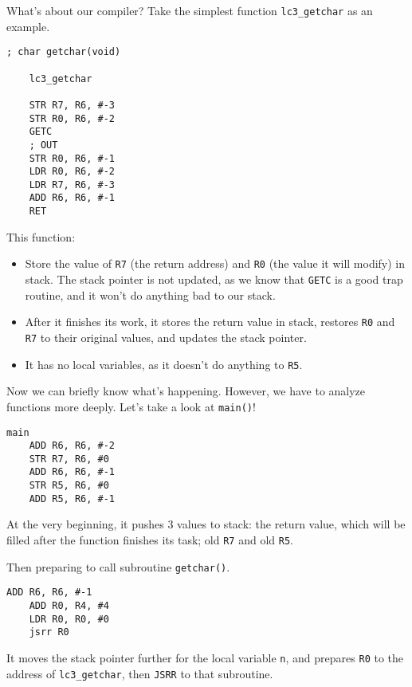 \documentclass{article}
\begin{document}
	What's about our compiler? Take the simplest function \texttt{lc3\_getchar} as an example.
	
	\begin{lstlisting}[caption={LC-3 implementation of \texttt{getchar()}}]
	; char getchar(void)
	
	lc3_getchar
	
	STR R7, R6, #-3
	STR R0, R6, #-2
	GETC
	; OUT
	STR R0, R6, #-1
	LDR R0, R6, #-2
	LDR R7, R6, #-3
	ADD R6, R6, #-1
	RET
	\end{lstlisting}
	
	This function:
	\begin{itemize}
	\item Store the value of \texttt{R7} (the return address) and \texttt{R0} (the value it will modify) in stack. The stack pointer is not updated, as we know that \texttt{GETC} is a good trap routine, and it won't do anything bad to our stack.
	\item After it finishes its work, it stores the return value in stack, restores \texttt{R0} and \texttt{R7} to their original values, and updates the stack pointer.
	\item It has no local variables, as it doesn't do anything to \texttt{R5}.
	\end{itemize}
	
	Now we can briefly know what's happening. However, we have to analyze functions more deeply. Let's take a look at \texttt{main()}!
	
	\begin{lstlisting}[caption={The beginning of \texttt{main}}]
	main
	ADD R6, R6, #-2
	STR R7, R6, #0
	ADD R6, R6, #-1
	STR R5, R6, #0
	ADD R5, R6, #-1
	\end{lstlisting}
	
	At the very beginning, it pushes 3 values to stack: the return value, which will be filled after the function finishes its task; old \texttt{R7} and old \texttt{R5}.
	
	Then preparing to call subroutine \texttt{getchar()}.
	
	\begin{lstlisting}[caption={Calling \texttt{getchar()}}]
	ADD R6, R6, #-1
	ADD R0, R4, #4
	LDR R0, R0, #0
	jsrr R0
	\end{lstlisting}
	
	It moves the stack pointer further for the local variable \texttt{n}, and prepares \texttt{R0} to the address of \texttt{lc3\_getchar}, then \texttt{JSRR} to that subroutine.
	
\end{document}
